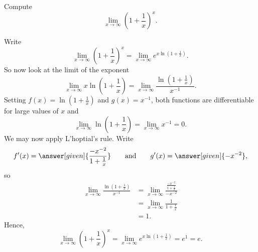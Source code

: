 \documentclass{ximera}
\begin{document}
\begin{example}
Compute
\[
\lim_{x\to \infty}\left(1 + \frac{1}{x}\right)^x.
\]
\begin{explanation}
Write
\[
\lim_{x\to \infty}\left(1 + \frac{1}{x}\right)^x = \lim_{x\to \infty}e^{x\ln\left(1 + \frac{1}{x}\right)}.
\]
So now look at the limit of the exponent
\[
\lim_{x\to\infty} x\ln\left(1 + \frac{1}{x}\right) = \lim_{x\to\infty} \frac{\ln\left(1 + \frac{1}{x}\right)}{x^{-1}}.
\]
Setting $f(x) = \ln\left(1 + \frac{1}{x}\right)$ and $g(x) = x^{-1}$,
both functions are differentiable for large values of $x$ and
\[
\lim_{x\to \infty}\ln\left(1 + \frac{1}{x}\right)=\lim_{x\to \infty}x^{-1} = 0.
\]
We may now apply L'hoptial's rule. Write
\[
f'(x) = \answer[given]{\frac{-x^{-2}}{1 + \frac{1}{x}}}\qquad\text{and}\qquad g'(x) = \answer[given]{-x^{-2}},
\]
so
\begin{align*}
\lim_{x\to\infty} \frac{\ln\left(1 + \frac{1}{x}\right)}{x^{-1}} &= \lim_{x\to\infty} \frac{\frac{-x^{-2}}{1 + \frac{1}{x}}}{-x^{-2}} \\
&=\lim_{x\to\infty} \frac{1}{1 + \frac{1}{x}}\\
&=1.
\end{align*}
Hence, 
\[
\lim_{x\to \infty}\left(1 + \frac{1}{x}\right)^x = \lim_{x\to \infty}e^{x\ln\left(1 + \frac{1}{x}\right)} =e^{1} = e.
\]
\end{explanation}
\end{example}
\end{document}
